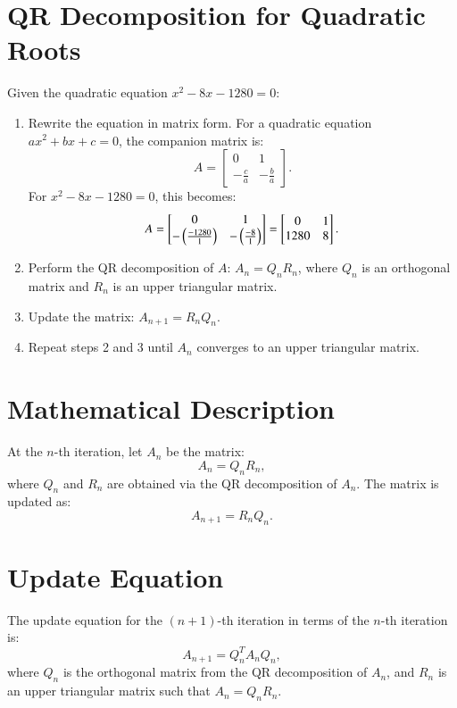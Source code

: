 \documentclass[journal]{IEEEtran}
\begin{document}
\section*{QR Decomposition for Quadratic Roots}
Given the quadratic equation \( x^2 - 8x - 1280 = 0 \):
\begin{enumerate}
    \item Rewrite the equation in matrix form. For a quadratic equation \( ax^2 + bx + c = 0 \), the companion matrix is:
    \[
    A = \begin{bmatrix}
    0 & 1 \\
    -\frac{c}{a} & -\frac{b}{a}
    \end{bmatrix}.
    \]
    For \( x^2 - 8x - 1280 = 0 \), this becomes:
    \[
    A = \begin{bmatrix}
    0 & 1 \\
    -\left(\frac{-1280}{1}\right) & -\left(\frac{-8}{1}\right)
    \end{bmatrix} = \begin{bmatrix}
    0 & 1 \\
    1280 & 8
    \end{bmatrix}.
    \]
    \item Perform the QR decomposition of \( A \): \( A_n = Q_n R_n \), where \( Q_n \) is an orthogonal matrix and \( R_n \) is an upper triangular matrix.
    \item Update the matrix: \( A_{n+1} = R_n Q_n \).
    \item Repeat steps 2 and 3 until \( A_n \) converges to an upper triangular matrix.
\end{enumerate}
\section*{Mathematical Description}
At the \(n\)-th iteration, let \( A_n \) be the matrix:
\[
A_n = Q_n R_n,
\]
where \( Q_n \) and \( R_n \) are obtained via the QR decomposition of \( A_n \). The matrix is updated as:
\[
A_{n+1} = R_n Q_n.
\]

\section*{Update Equation}
The update equation for the \((n+1)\)-th iteration in terms of the \(n\)-th iteration is:
\[
A_{n+1} = Q_n^T A_n Q_n,
\]
where \( Q_n \) is the orthogonal matrix from the QR decomposition of \( A_n \), and \( R_n \) is an upper triangular matrix such that \( A_n = Q_n R_n \).
\end{document}
